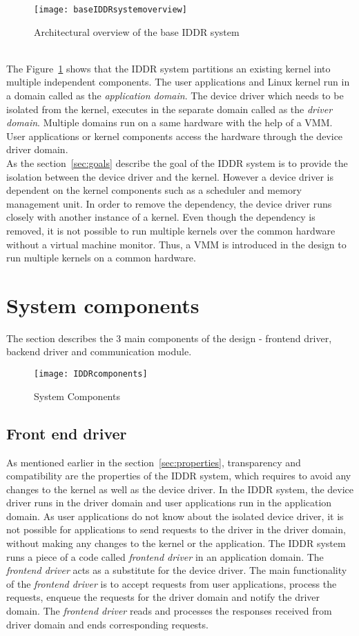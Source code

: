 \begin{figure}[!ht]
\centering
\texttt{[image: baseIDDRsystemoverview]}
\caption{Architectural overview of the base IDDR system}
\label{fig:base IDDR system overview}
\end{figure}
\\[3mm]
The Figure~\ref{fig:base IDDR system overview} shows that the IDDR system partitions an existing kernel into multiple independent components. The user applications and Linux kernel run in a domain called as the \textit{application domain}. The device driver which needs to be isolated from the kernel, executes in the separate domain called as the \textit{driver domain}. Multiple domains run on a same hardware with the help of a VMM. User applications or kernel components access the hardware through the device driver domain.
\\[3mm]
As the section~\ref{sec:goals} describe the goal of the IDDR system is to provide the isolation between the device driver and the kernel. However a device driver is dependent on the kernel components such as a scheduler and memory management unit. In order to remove the dependency, the device driver runs closely with another instance of a kernel. Even though the dependency is removed, it is not possible to run multiple kernels over the common hardware without a virtual machine monitor. Thus, a VMM is introduced in the design to run multiple kernels on a common hardware. 

\section{System components}\label{components}
The section describes the 3 main components of the design - frontend driver, backend driver and communication module.
\begin{figure}[!ht]
\centering
\texttt{[image: IDDRcomponents]}
\caption{System Components}
\label{fig:Design Evo1}
\end{figure}

\subsection{Front end driver}
\label{subsec:frontend}
As mentioned earlier in the section~\ref{sec:properties}, transparency and compatibility are the properties of the IDDR system, which requires to avoid any changes to the kernel as well as the device driver. In the IDDR system, the device driver runs in the driver domain and user applications run in the application domain. As user applications do not know about the isolated device driver, it is not possible for applications to send requests to the driver in the driver domain, without making any changes to the kernel or the application. The IDDR system runs a piece of a code called \textit{frontend driver} in an application domain. The \textit{frontend driver} acts as a substitute for the device driver. The main functionality of the \textit{frontend driver} is to accept requests from user applications, process the requests, enqueue the requests for the driver domain and notify the driver domain. The \textit{frontend driver} reads and processes the responses received from driver domain and ends corresponding requests.

